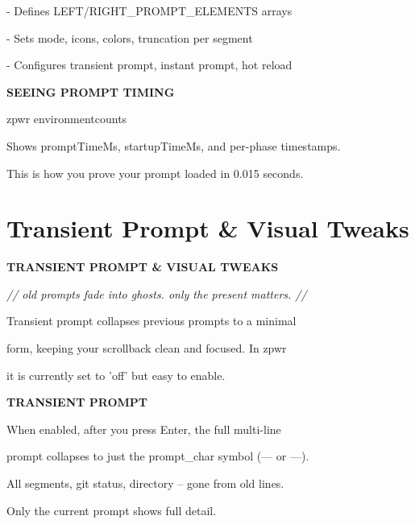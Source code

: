 \documentclass[11pt,a4paper,twoside]{book}
\begin{document}
- Defines LEFT/RIGHT\_PROMPT\_ELEMENTS arrays

- Sets mode, icons, colors, truncation per segment

- Configures transient prompt, instant prompt, hot reload


\vspace{12pt}
{\bfseries\color{neonyellow} SEEING PROMPT TIMING}\vspace{4pt}

\begin{codebox}
zpwr environmentcounts\\
\end{codebox}

Shows promptTimeMs, startupTimeMs, and per-phase timestamps.

This is how you prove your prompt loaded in 0.015 seconds.


\vspace{16pt}

\section{Transient Prompt \& Visual Tweaks}


\vspace{10pt}
{\large\bfseries\color{neoncyan} TRANSIENT PROMPT \& VISUAL TWEAKS}\vspace{6pt}

{\small\itshape\color{dimtext} // old prompts fade into ghosts. only the present matters. //}

Transient prompt collapses previous prompts to a minimal

\begin{codebox}
form, keeping your scrollback clean and focused. In zpwr\\
\end{codebox}

it is currently set to 'off' but easy to enable.


\vspace{12pt}
{\bfseries\color{neonyellow} TRANSIENT PROMPT}\vspace{4pt}

When enabled, after you press Enter, the full multi-line

prompt collapses to just the prompt\_char symbol (--- or ---).

All segments, git status, directory -- gone from old lines.

Only the current prompt shows full detail.
\end{document}
